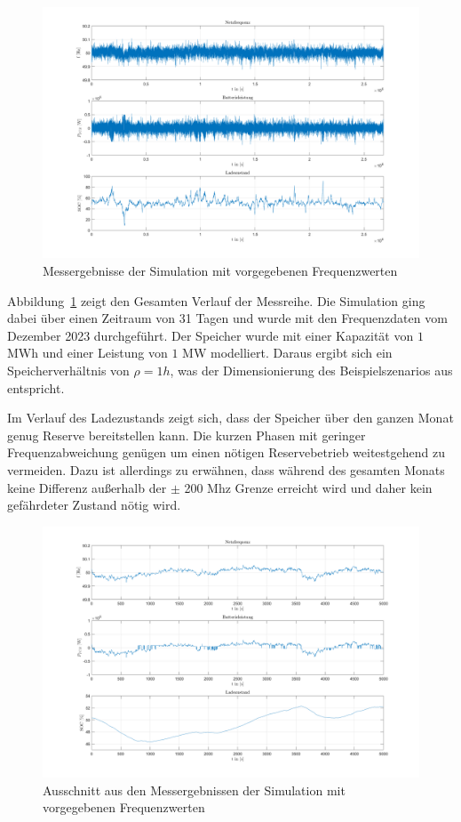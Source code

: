 \begin{figure}[h!]
	\centering
	\includegraphics[width=14cm]{Abbildungen/SteuerungFCR.png}
	\caption{Messergebnisse der Simulation mit vorgegebenen Frequenzwerten}\label{FCRMessung}
\end{figure}

Abbildung~\ref{FCRMessung} zeigt den Gesamten Verlauf der Messreihe.
Die Simulation ging dabei über einen Zeitraum von 31 Tagen und wurde mit den Frequenzdaten vom Dezember 2023 durchgeführt.
Der Speicher wurde mit einer Kapazität von $1$ MWh und einer Leistung von $1$ MW modelliert.
Daraus ergibt sich ein Speicherverhältnis von $\rho = 1h$, was der Dimensionierung des Beispielszenarios aus\parencite[S. 7]{Reservebetrieb}
entspricht.

Im Verlauf des Ladezustands zeigt sich, dass der Speicher über den ganzen Monat genug Reserve bereitstellen kann.
Die kurzen Phasen mit geringer Frequenzabweichung genügen um einen nötigen Reservebetrieb weitestgehend zu vermeiden.
Dazu ist allerdings zu erwähnen, dass während des gesamten Monats keine Differenz außerhalb der $\pm$ 200 Mhz Grenze erreicht wird
und daher kein gefährdeter Zustand nötig wird.

\begin{figure}[h!]
	\centering
	\includegraphics[width=14cm]{Abbildungen/SteuerungFCR2.png}
	\caption{Ausschnitt aus den Messergebnissen der Simulation mit vorgegebenen Frequenzwerten}\label{FCRMessung2}
\end{figure}


